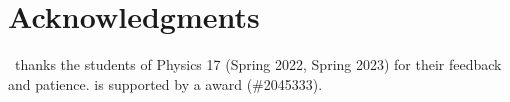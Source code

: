 \documentclass[12pt]{article}
\begin{document}
\section*{Acknowledgments}

\ thanks the students of Physics 17 (Spring 2022, Spring 2023) for their feedback and patience.
%
 is supported by a  award (\#2045333).



% 
\end{document}
